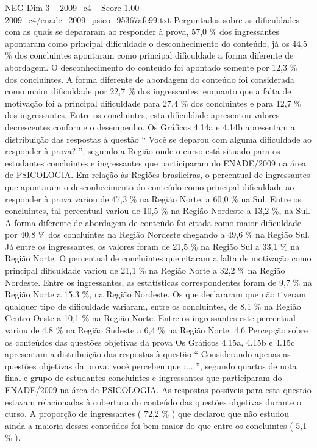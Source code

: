 \begin{textsample}{NEG Dim 3 – 2009\_c4 – Score 1.00 – 2009\_c4/enade\_2009\_psico\_95367afe99.txt}
Perguntados sobre as dificuldades com as quais se depararam ao responder à prova, 57,0 \% dos ingressantes apontaram como principal dificuldade o desconhecimento do conteúdo, já os 44,5 \% dos concluintes apontaram como principal dificuldade a forma diferente de abordagem.
O desconhecimento do conteúdo foi apontado somente por 12,3 \% dos concluintes.
A forma diferente de abordagem do conteúdo foi considerada como maior dificuldade por 22,7 \% dos ingressantes, enquanto que a falta de motivação foi a principal dificuldade para 27,4 \% dos concluintes e para 12,7 \% dos ingressantes.
Entre os concluintes, esta dificuldade apresentou valores decrescentes conforme o desempenho.
Os Gráficos 4.14a e 4.14b apresentam a distribuição das respostas à questão “ Você se deparou com alguma dificuldade ao responder à prova? ”, segundo a Região onde o curso está situado para os estudantes concluintes e ingressantes que participaram do ENADE/2009 na área de PSICOLOGIA.
Em relação às Regiões brasileiras, o percentual de ingressantes que apontaram o desconhecimento do conteúdo como principal dificuldade ao responder à prova variou de 47,3 \% na Região Norte, a 60,0 \% na Sul.
Entre os concluintes, tal percentual variou de 10,5 \% na Região Nordeste a 13,2 \%, na Sul.
A forma diferente de abordagem de conteúdo foi citada como maior dificuldade por 40,8 \% dos concluintes na Região Nordeste chegando a 49,6 \% na Região Sul.
Já entre os ingressantes, os valores foram de 21,5 \% na Região Sul a 33,1 \% na Região Norte.
O percentual de concluintes que citaram a falta de motivação como principal dificuldade variou de 21,1 \% na Região Norte a 32,2 \% na Região Nordeste.
Entre os ingressantes, as estatísticas correspondentes foram de 9,7 \% na Região Norte a 15,3 \%, na Região Nordeste.
Os que declararam que não tiveram qualquer tipo de dificuldade variaram, entre os concluintes, de 8,1 \% na Região Centro-Oeste a 10,1 \% na Região Norte.
Entre os ingressantes este percentual variou de 4,8 \% na Região Sudeste a 6,4 \% na Região Norte. 4.6 Percepção sobre os conteúdos das questões objetivas da prova Os Gráficos 4.15a, 4.15b e 4.15c apresentam a distribuição das respostas à questão “ Considerando apenas as questões objetivas da prova, você percebeu que :... ”, segundo quartos de nota final e grupo de estudantes concluintes e ingressantes que participaram do ENADE/2009 na área de PSICOLOGIA.
As respostas possíveis para esta questão estavam relacionadas à cobertura do conteúdo das questões objetivas durante o curso.
A proporção de ingressantes ( 72,2 \% ) que declarou que não estudou ainda a maioria desses conteúdos foi bem maior do que entre os concluintes ( 5,1 \% ).

\end{textsample}
